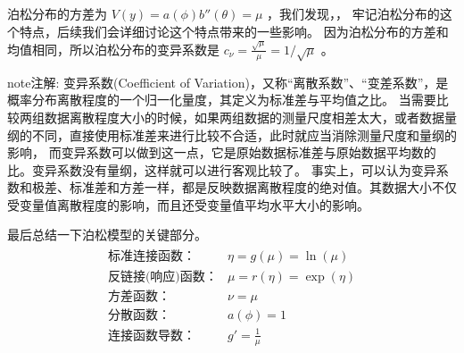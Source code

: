 \documentclass[letterpaper,10pt,english]{sphinxmanual}
\begin{document}
泊松分布的方差为 \(V(y)=a(\phi)b''(\theta)=\mu\)
，我们发现，，
牢记泊松分布的这个特点，后续我们会详细讨论这个特点带来的一些影响。
因为泊松分布的方差和均值相同，所以泊松分布的变异系数是
\(c_{\nu} = \frac{\sqrt{\mu}}{\mu} =1/\sqrt{\mu}\) 。

\begin{sphinxadmonition}{note}{注解:}
变异系数(Coefficient of Variation)，又称“离散系数”、“变差系数”，是概率分布离散程度的一个归一化量度，其定义为标准差与平均值之比。
当需要比较两组数据离散程度大小的时候，如果两组数据的测量尺度相差太大，或者数据量纲的不同，直接使用标准差来进行比较不合适，此时就应当消除测量尺度和量纲的影响，
而变异系数可以做到这一点，它是原始数据标准差与原始数据平均数的比。变异系数没有量纲，这样就可以进行客观比较了。
事实上，可以认为变异系数和极差、标准差和方差一样，都是反映数据离散程度的绝对值。其数据大小不仅受变量值离散程度的影响，而且还受变量值平均水平大小的影响。
\end{sphinxadmonition}

最后总结一下泊松模型的关键部分。
\begin{align}\label{equation:泊松模型/content:泊松模型/content:8}\!\begin{aligned}
\text{标准连接函数：}  & \eta= g(\mu) = \ln(\mu)\\
\text{反链接(响应)函数：}  & \mu=r(\eta) = \exp(\eta)\\
\text{方差函数：}  & \nu= \mu\\
\text{分散函数：}  & a(\phi) = 1\\
\text{连接函数导数：} & g'= \frac{1}{\mu}\\
\end{aligned}\end{align}
\end{document}
